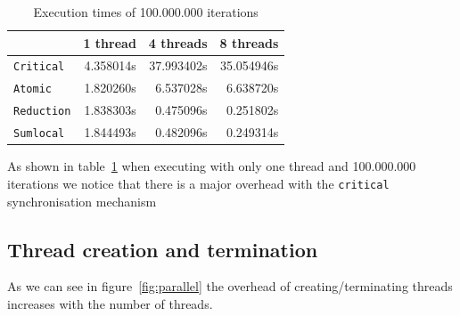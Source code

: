 \begin{table}[H]
\centering
\begin{tabular}{lrrr}
\toprule
    & 1 thread & 4 threads & 8 threads \\
\midrule
    \texttt{Critical}    & 4.358014s     & 37.993402s    & 35.054946s    \\
    \texttt{Atomic}      & 1.820260s     & 6.537028s     & 6.638720s     \\
    \texttt{Reduction}   & 1.838303s     & 0.475096s     & 0.251802s     \\
    \texttt{Sumlocal}    & 1.844493s     & 0.482096s     & 0.249314s     \\
\bottomrule
\end{tabular}

\caption{Execution times of 100.000.000 iterations} 
\label{tab:Execution_time}
\end{table}



As shown in table~\ref{tab:Execution_time} when executing with only one thread and 100.000.000 iterations we notice that there is a major overhead with the \texttt{critical} synchronisation mechanism



\subsection{Thread creation and termination}

As we can see in figure~\ref{fig:parallel} the overhead of creating/terminating threads increases with the number of threads.

